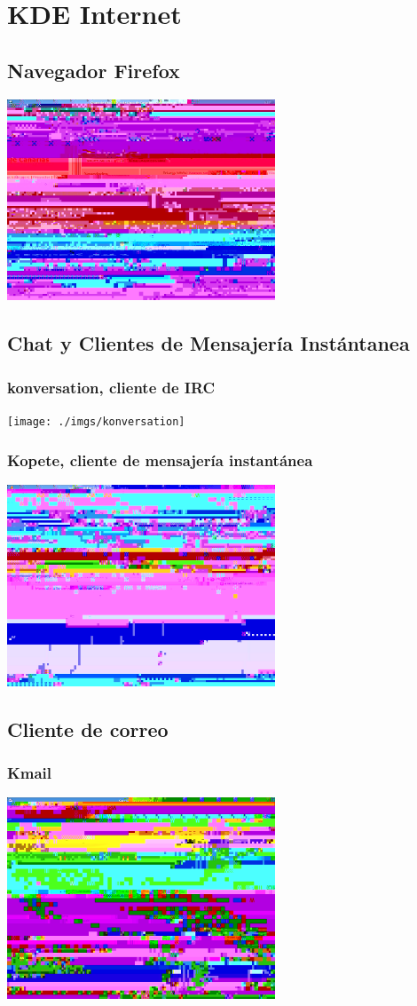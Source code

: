 \section{KDE Internet}
\subsection{Navegador Firefox}
\frame
{
	\begin{center}
    \includegraphics[height=6cm]{./imgs/konqueror-gulic}
  \end{center}
}
\subsection{Chat y Clientes de Mensajería Instántanea}
\frame
{
	\frametitle{konversation, cliente de IRC}
	\begin{center}
		\texttt{[image: ./imgs/konversation]}
	\end{center}
}
\frame
{
	\frametitle{Kopete, cliente de mensajería instantánea}
	\begin{center}
		\includegraphics[height=6cm]{./imgs/kopete}
	\end{center}
}
\subsection{Cliente de correo}
\frame
{
	\frametitle{Kmail}
	\begin{center}
		\includegraphics[height=6cm]{./imgs/kmail}
	\end{center}
}
